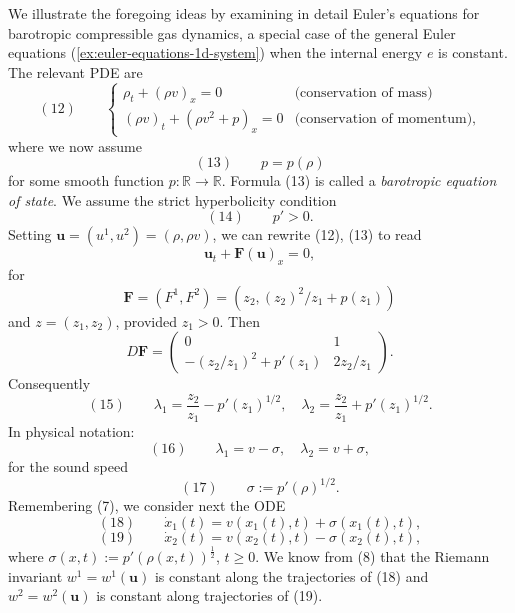 \begin{example}
\label{ex:barotropic-gas-dynamics-riemann-invariants}
We illustrate the foregoing ideas by examining in detail Euler's equations for barotropic compressible gas dynamics, a special case of the general Euler equations (\cref{ex:euler-equations-1d-system}) when the internal energy $e$ is constant. The relevant PDE are
$$(12) \qquad \begin{cases} \rho_t + (\rho v)_x = 0 & \text{(conservation of mass)} \\ (\rho v)_t + (\rho v^2+p)_x = 0 & \text{(conservation of momentum)}, \end{cases}$$
where we now assume
$$(13) \qquad p = p(\rho)$$
for some smooth function $p:\mathbb{R}\to\mathbb{R}$. Formula (13) is called a \textit{barotropic equation of state}. We assume the strict hyperbolicity condition
$$(14) \qquad p' > 0.$$
Setting $\mathbf{u}=(u^1,u^2)=(\rho,\rho v)$, we can rewrite (12), (13) to read
$$\mathbf{u}_t + \mathbf{F}(\mathbf{u})_x = 0,$$
for
$$\mathbf{F} = (F^1,F^2) = (z_2, (z_2)^2/z_1 + p(z_1))$$
and $z=(z_1,z_2)$, provided $z_1>0$. Then
$$D\mathbf{F} = \begin{pmatrix} 0 & 1 \\ -(z_2/z_1)^2 + p'(z_1) & 2z_2/z_1 \end{pmatrix}.$$
Consequently
$$(15) \qquad \lambda_1 = \frac{z_2}{z_1} - p'(z_1)^{1/2}, \quad \lambda_2 = \frac{z_2}{z_1} + p'(z_1)^{1/2}.$$
In physical notation:
$$(16) \qquad \lambda_1 = v-\sigma, \quad \lambda_2 = v+\sigma,$$
for the sound speed
$$(17) \qquad \sigma := p'(\rho)^{1/2}.$$
Remembering (7), we consider next the ODE
$$(18) \qquad \dot x_1(t) = v(x_1(t),t) + \sigma(x_1(t),t),$$
$$(19) \qquad \dot x_2(t) = v(x_2(t),t) - \sigma(x_2(t),t),$$
where $\sigma(x,t) := p'(\rho(x,t))^{\frac12}$, $t\geq 0$. We know from (8) that the Riemann invariant $w^1=w^1(\mathbf{u})$ is constant along the trajectories of (18) and $w^2=w^2(\mathbf{u})$ is constant along trajectories of (19).


\end{example}
